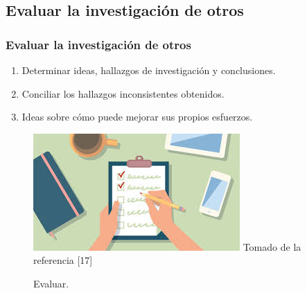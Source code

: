 \documentclass{beamer}
\newcounter{sauvegardeenumi}
\newcommand{\asuivre}{\setcounter{sauvegardeenumi}{\theenumi}}
\begin{document}
    \subsection{Evaluar la investigaci\'on de otros}
        \begin{frame}
        \frametitle{Evaluar la investigaci\'on de otros}
        \begin{multicols}{2}
            \begin{enumerate}
                \item Determinar ideas, hallazgos de investigaci\'on y conclusiones.
                \item Conciliar los hallazgos inconsistentes obtenidos.
                \item Ideas sobre c\'omo puede mejorar sus propios esfuerzos.        
                \asuivre
            \end{enumerate}
             \begin{figure}
                \includegraphics[scale=0.45]{figures/checklist}
                \newline
                {\tiny Tomado de la referencia [17] }
                \caption{Evaluar. }
            \end{figure}
        \end{multicols}
        \end{frame}
\end{document}
